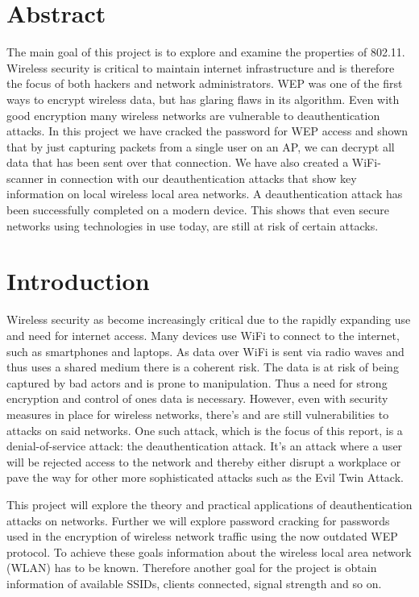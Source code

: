 \section*{Abstract}
The main goal of this project is to explore and examine the properties of 802.11. Wireless security is critical to maintain internet infrastructure and is therefore the focus of both hackers and network administrators. WEP was one of the first ways to encrypt wireless data, but has glaring flaws in its algorithm. Even with good encryption many wireless networks are vulnerable to deauthentication attacks. In this project we have cracked the password for WEP access and shown that by just capturing packets from a single user on an AP, we can decrypt all data that has been sent over that connection. We have also created a WiFi-scanner in connection with our deauthentication attacks that show key information on local wireless local area networks. A deauthentication attack has been successfully completed on a modern device. This shows that even secure networks using technologies in use today, are still at risk of certain attacks. 

\newpage
\tableofcontents
\newpage

\section{Introduction}
Wireless security as become increasingly critical due to the rapidly expanding use and need for internet access. Many devices use WiFi to connect to the internet, such as smartphones and laptops. As data over WiFi is sent via radio waves and thus uses a shared medium there is a coherent risk. The data is at risk of being captured by bad actors and is prone to manipulation. Thus a need for strong encryption and control of ones data is necessary. However, even with security measures in place for wireless networks, there's and are still vulnerabilities to attacks on said networks. One such attack, which is the focus of this report, is a denial-of-service attack: the deauthentication attack. It's an attack where a user will be rejected access to the network and thereby either disrupt a workplace or pave the way for other more sophisticated attacks such as the Evil Twin Attack.

This project will explore the theory and practical applications of deauthentication attacks on networks. Further we will explore password cracking for passwords used in the encryption of wireless network traffic using the now outdated WEP protocol. To achieve these goals information about the wireless local area network (WLAN) has to be known. Therefore another goal for the project is obtain information of available SSIDs, clients connected, signal strength and so on.

